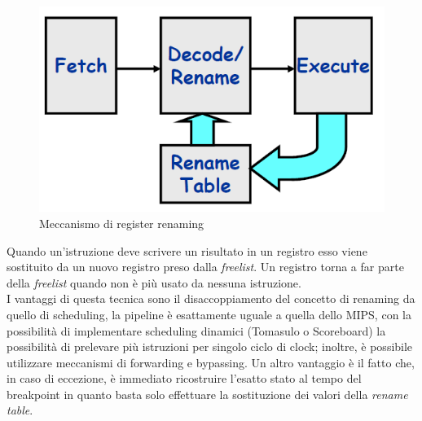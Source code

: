 \begin{figure}[htb]
\centering
\includegraphics[scale=0.5]{img/translation.png}
\caption{Meccanismo di register renaming}\label{fig:translation}
\end{figure}
Quando un'istruzione deve scrivere un risultato in un registro esso viene sostituito da un nuovo registro preso dalla \emph{freelist}. Un registro torna a far parte della \emph{freelist} quando non è più usato da nessuna istruzione.\\
I vantaggi di questa tecnica sono il disaccoppiamento del concetto di renaming da quello di scheduling, la pipeline è esattamente uguale a quella dello MIPS, con la possibilità di implementare scheduling dinamici (Tomasulo o Scoreboard) la possibilità di prelevare più istruzioni per singolo ciclo di clock; inoltre, è possibile utilizzare meccanismi di forwarding e bypassing. Un altro vantaggio è il fatto che, in caso di eccezione, è immediato ricostruire l'esatto stato al tempo del breakpoint in quanto basta solo effettuare la sostituzione dei valori della \emph{rename table}.
